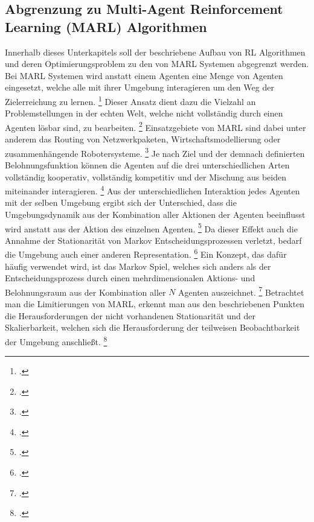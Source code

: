 \subsection{Abgrenzung zu Multi-Agent Reinforcement Learning (MARL) Algorithmen}
Innerhalb dieses Unterkapitels soll der beschriebene Aufbau von RL Algorithmen und deren Optimierungsproblem zu den von MARL Systemen abgegrenzt werden.
Bei MARL Systemen wird anstatt einem Agenten eine Menge von Agenten eingesetzt, welche alle mit ihrer Umgebung interagieren um den Weg der Zielerreichung zu lernen. \footcite[Vgl.][S. 6]{Wong.2022}
Dieser Ansatz dient dazu die Vielzahl an Problemstellungen in der echten Welt, welche nicht vollständig durch einen Agenten lösbar sind, zu bearbeiten. \footcite[Vgl.][S. 1]{Canese.2021}
Einsatzgebiete von MARL sind dabei unter anderem das Routing von Netzwerkpaketen, Wirtschaftsmodellierung oder zusammenhängende Robotersysteme. \footcite[Vgl.][S. 1]{Canese.2021}
Je nach Ziel und der demnach definierten Belohnungsfunktion können die Agenten auf die drei unterschiedlichen Arten vollständig kooperativ, vollständig kompetitiv und der Mischung aus beiden miteinander interagieren. \footcite[Vgl.][S. 8f.]{Canese.2021}
Aus der unterschiedlichen Interaktion jedes Agenten mit der selben Umgebung ergibt sich der Unterschied, dass die Umgebungsdynamik aus der Kombination aller Aktionen der Agenten beeinflusst wird anstatt aus der Aktion des einzelnen Agenten. \footcite[Vgl.][S. 2]{Wong.2022} %
Da dieser Effekt auch die Annahme der Stationarität von Markov Entscheidungsprozessen verletzt, bedarf die Umgebung auch einer anderen Representation. \footcite[Vgl.][S. 6]{Wong.2022} %
Ein Konzept, das dafür häufig verwendet wird, ist das Markov Spiel, welches sich anders als der Entscheidungsprozess durch einen mehrdimensionalen Aktions- und Belohnungsraum aus der Kombination aller $N$ Agenten auszeichnet. \footcite[Vgl.][S. 4]{Canese.2021}
Betrachtet man die Limitierungen von MARL, erkennt man aus den beschriebenen Punkten die Herausforderungen der nicht vorhandenen Stationarität und der Skalierbarkeit, welchen sich die Herausforderung der teilweisen Beobachtbarkeit der Umgebung anschließt. \footcite[Vgl.][S. 9ff.]{Canese.2021}

